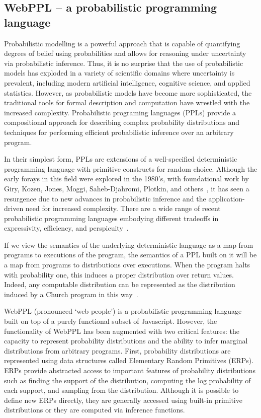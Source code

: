 \documentclass[11pt]{article}
\begin{document}
\subsection{WebPPL -- a probabilistic programming language}

Probabilistic modelling is a powerful approach that is capable of quantifying degrees of belief using probabilities and allows for reasoning under uncertainty via probabilistic inference. Thus, it is no surprise that the use of probabilistic models has exploded in a variety of scientific domains where uncertainty is prevalent, including modern artificial intelligence, cognitive science, and applied statistics. However, as probabilistic models have become more sophisticated, the traditional tools for formal description and computation have wrestled with the increased complexity. Probabilistic programing languages (PPLs) provide a compositional approach for describing complex probability distributions and techniques for performing efficient probabilistic inference over an arbitrary program. 

In their simplest form, PPLs are extensions of a well-specified deterministic programming language with primitive constructs for random choice. Although the early forays in this field were explored in the 1980's, with foundational work by Giry, Kozen, Jones, Moggi, Saheb-Djahromi, Plotkin, and others~\cite{jones89:lics}, it has seen a resurgence due to new advances in probabilistic inference and the application-driven need for increased complexity. There are a wide range of recent probabilistic programming languages embodying different tradeoffs in expressivity, efficiency, and perspicuity~\cite{goodman08:uai, kimmig11:tplp, kiselyov09:dsl, maccallum09:nips, milch05:ijcai, pfeffer01:ijcai, pfeffer09:tr, poole08:pilp, richardson06:ml, sato97:ijcai}. 

If we view the semantics of the underlying deterministic language as a map from programs to executions of the program, the semantics of a PPL built on it will be a map from programs to distributions over executions. When the program halts with probability one, this induces a proper distribution over return values. Indeed, any computable distribution can be represented as the distribution induced by a Church program in this way~\cite{freer12:appl}.

WebPPL (pronounced `web people') is a probabilistic programming language built on top of a purely functional subset of Javascript. However, the functionality of WebPPL has been augmented with two critical features: the capacity to represent probability distributions and the ability to infer marginal distributions from arbitrary programs. First, probability distributions are represented using data structures called Elementary Random Primitives (ERPs). ERPs provide abstracted access to important features of probability distributions such as finding the support of the distribution, computing the log probability of each support, and sampling from the distribution. Although it is possible to define new ERPs directly, they are generally accessed using built-in primitive distributions or they are computed via inference functions. 
\end{document}
